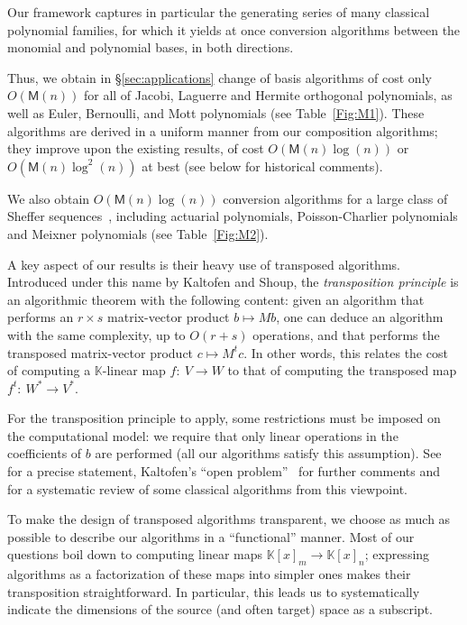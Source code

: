 \documentclass{sig-alternate}
\def\K {\ensuremath{\mathbb{K}}}
\def\M{\ensuremath{\mathsf{M}}}
\begin{document}
\smallskip{} Our framework captures in
particular the generating series of many classical polynomial
families, for which it yields at once conversion algorithms between
the monomial and polynomial bases, in both directions.

Thus, we obtain in \S\ref{sec:applications} change of basis
algorithms of cost only $O(\M(n))$ for all of Jacobi, Laguerre and
Hermite orthogonal polynomials, as well as Euler, Bernoulli, and Mott
polynomials (see Table~\ref{Fig:M1}). These algorithms are derived
in a uniform manner from our composition algorithms; they improve upon
the existing results, of cost $O(\M(n) \log(n))$ or $O(\M(n)
\log^2(n))$ at best (see below for historical comments).

We also obtain $O(\M(n) \log(n))$ conversion algorithms for a large
class of Sheffer sequences~\cite[Chap.~2]{Roman05}, including
actuarial polynomials, Poisson-Charlier polynomials and Meix\-ner
polynomials (see Table~\ref{Fig:M2}).

\smallskip{} A key aspect of our results is
their heavy use of transposed algorithms. Introduced under this name
by Kaltofen and Shoup, the \emph{transposition principle} is an
algorithmic theorem with the following content: given an algorithm
that performs an $r \times s$ matrix-vector product $b \mapsto M b$,
one can deduce an algorithm with the same complexity, up to $O(r+s)$
operations, and that performs the transposed matrix-vector product $c
\mapsto M^t c$. In other words, this relates the cost of computing a
$\K$-linear map $f:\ V \to W$ to that of computing the transposed map
$f^t:\ W^* \to V^*$.

For the transposition principle to apply, some restrictions must be
imposed on the computational model: we require that only linear
operations in the coefficients of $b$ are performed (all our
algorithms satisfy this assumption). See~\cite{BuClSh97} for a precise
statement, Kaltofen's ``open problem''~\cite{Kaltofen00} for further
comments and~\cite{BoLeSc03} for a systematic review of some classical
algorithms from this viewpoint.

To make the design of transposed algorithms transparent, we choose as
much as possible to describe our algorithms in a ``functional''
manner. Most of our questions boil down to computing linear maps
$\K[x]_m \to \K[x]_n$; expressing algorithms as a factorization of
these maps into simpler ones makes their transposition
straightforward. In particular, this leads us to systematically
indicate the dimensions of the source (and often target) space as
a subscript.
\end{document}
